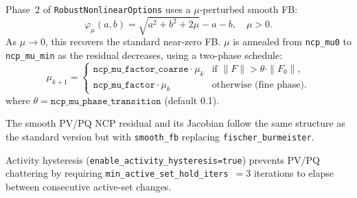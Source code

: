 Phase~2 of \texttt{RobustNonlinearOptions} uses a $\mu$-perturbed smooth FB:
\begin{equation}
  \varphi_\mu(a, b) = \sqrt{a^2 + b^2 + 2\mu} - a - b, \quad \mu > 0.
\end{equation}
As $\mu \to 0$, this recovers the standard near-zero FB.  $\mu$ is annealed
from \texttt{ncp\_mu0} to \texttt{ncp\_mu\_min} as the residual decreases,
using a two-phase schedule:
\begin{equation}
  \mu_{k+1} = \begin{cases}
    \texttt{ncp\_mu\_factor\_coarse} \cdot \mu_k & \text{if } \|F\| > \theta \cdot \|F_0\|, \\
    \texttt{ncp\_mu\_factor} \cdot \mu_k & \text{otherwise (fine phase)}.
  \end{cases}
\end{equation}
where $\theta = \texttt{ncp\_mu\_phase\_transition}$ (default 0.1).

The smooth PV/PQ NCP residual and its Jacobian follow the same structure
as the standard version but with \texttt{smooth\_fb} replacing
\texttt{fischer\_burmeister}.

Activity hysteresis (\texttt{enable\_activity\_hysteresis=true}) prevents
PV/PQ chattering by requiring \texttt{min\_active\_set\_hold\_iters}~$=3$
iterations to elapse between consecutive active-set changes.
